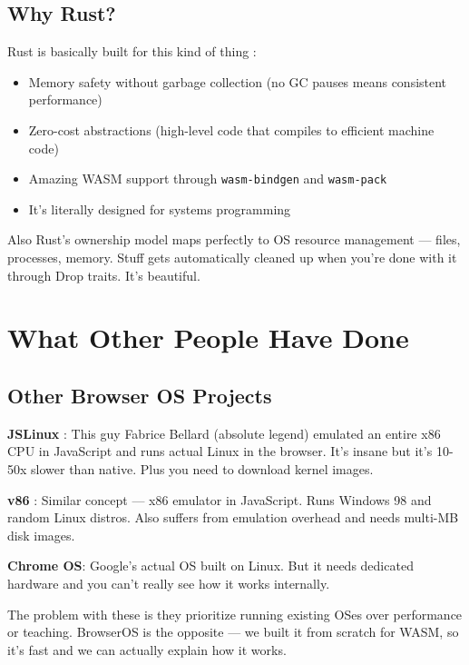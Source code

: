 \documentclass[conference]{IEEEtran}
\begin{document}
\subsection{Why Rust?}

Rust is basically built for this kind of thing \cite{matsakis2014rust}:

\begin{itemize}
    \item Memory safety without garbage collection (no GC pauses means consistent performance)
    \item Zero-cost abstractions (high-level code that compiles to efficient machine code)
    \item Amazing WASM support through \texttt{wasm-bindgen} and \texttt{wasm-pack}
    \item It's literally designed for systems programming
\end{itemize}

Also Rust's ownership model maps perfectly to OS resource management — files, processes, memory. Stuff gets automatically cleaned up when you're done with it through Drop traits. It's beautiful.

\section{What Other People Have Done}

\subsection{Other Browser OS Projects}

\textbf{JSLinux} \cite{bellard2011jslinux}: This guy Fabrice Bellard (absolute legend) emulated an entire x86 CPU in JavaScript and runs actual Linux in the browser. It's insane but it's 10-50x slower than native. Plus you need to download kernel images.

\textbf{v86} \cite{copy2014v86}: Similar concept — x86 emulator in JavaScript. Runs Windows 98 and random Linux distros. Also suffers from emulation overhead and needs multi-MB disk images.

\textbf{Chrome OS}: Google's actual OS built on Linux. But it needs dedicated hardware and you can't really see how it works internally.

The problem with these is they prioritize running existing OSes over performance or teaching. BrowserOS is the opposite — we built it from scratch for WASM, so it's fast and we can actually explain how it works.
\end{document}
